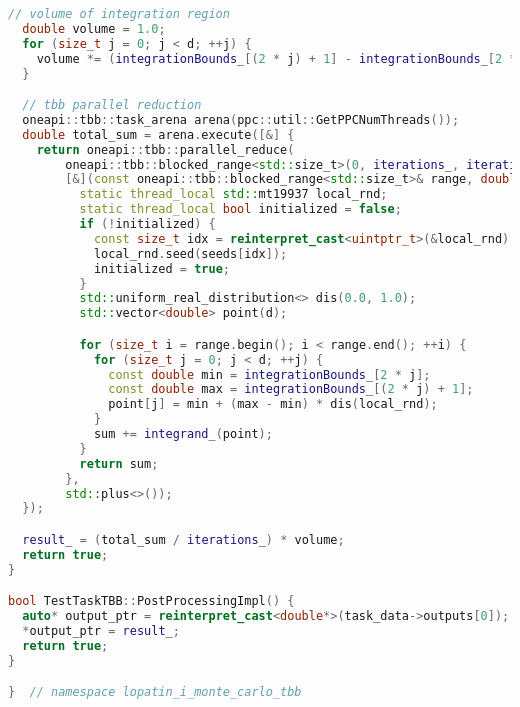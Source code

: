 \documentclass[12pt,a4paper]{extarticle}
\begin{document}
\begin{lstlisting}[language=C++]
  // volume of integration region
  double volume = 1.0;
  for (size_t j = 0; j < d; ++j) {
    volume *= (integrationBounds_[(2 * j) + 1] - integrationBounds_[2 * j]);
  }

  // tbb parallel reduction
  oneapi::tbb::task_arena arena(ppc::util::GetPPCNumThreads());
  double total_sum = arena.execute([&] {
    return oneapi::tbb::parallel_reduce(
        oneapi::tbb::blocked_range<std::size_t>(0, iterations_, iterations_ / arena.max_concurrency()), 0.0,
        [&](const oneapi::tbb::blocked_range<std::size_t>& range, double sum) {
          static thread_local std::mt19937 local_rnd;
          static thread_local bool initialized = false;
          if (!initialized) {
            const size_t idx = reinterpret_cast<uintptr_t>(&local_rnd) % num_threads;
            local_rnd.seed(seeds[idx]);
            initialized = true;
          }
          std::uniform_real_distribution<> dis(0.0, 1.0);
          std::vector<double> point(d);

          for (size_t i = range.begin(); i < range.end(); ++i) {
            for (size_t j = 0; j < d; ++j) {
              const double min = integrationBounds_[2 * j];
              const double max = integrationBounds_[(2 * j) + 1];
              point[j] = min + (max - min) * dis(local_rnd);
            }
            sum += integrand_(point);
          }
          return sum;
        },
        std::plus<>());
  });

  result_ = (total_sum / iterations_) * volume;
  return true;
}

bool TestTaskTBB::PostProcessingImpl() {
  auto* output_ptr = reinterpret_cast<double*>(task_data->outputs[0]);
  *output_ptr = result_;
  return true;
}

}  // namespace lopatin_i_monte_carlo_tbb
\end{lstlisting}
\end{document}
